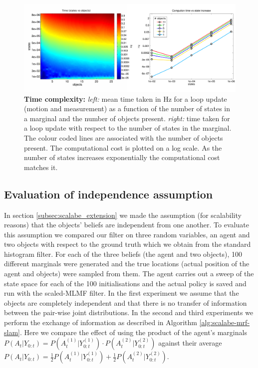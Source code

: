 \begin{figure}
 \includegraphics[width=\textwidth]{./ch5-MLMF/Figures/Figure12.pdf}
 \caption{\textbf{Time complexity:} \textit{left:} mean time taken in Hz for a loop update (motion and measurement) as a function of the number of states in a marginal and the 
 number of objects present. \textit{right:} time taken for a loop update with respect to the number of states in the marginal. The colour coded lines are 
 associated with the number of objects present. The computational cost is plotted on a log scale. As the number of states increases exponentially the
 computational cost matches it.}
 \label{fig:time_complexity}
\end{figure}


\subsection{Evaluation of independence assumption}\label{subsec:eval_indep_assumptiom}

In section \ref{subsec:scalabe_extension} we made the assumption (for scalability reasons) that the objects' beliefs are independent
from one another. To evaluate this assumption we compared our filter on three random variables, an agent and two objects with respect to the ground truth
which we obtain from the standard histogram filter. For each of the three beliefs (the agent and two objects), 100 different marginals 
were generated and the true locations (actual position of the agent and objects) were sampled from them. 
The agent carries out  a sweep of the state space for each of the 100 initialisations and the actual policy is saved 
and run with the scaled-MLMF filter. In the first experiment we assume that the objects are completely independent 
and that there is no transfer of information between the pair-wise joint distributions. In the second and third experiments we perform the exchange of information as 
described in Algorithm \ref{alg:scalabe-mrf-slam}. Here we compare the effect of using the product of the agent's marginals $P(A_t|Y_{0:t}) = P(A^{(1)}_t|Y^{(1)}_{0:t}) \cdot P(A^{(2)}_t|Y^{(2)}_{0:t})$ 
against their average $P(A_t|Y_{0:t}) = \frac{1}{2}P(A^{(1)}_t|Y^{(1)}_{0:t}) + \frac{1}{2}P(A^{(2)}_t|Y^{(2)}_{0:t})$. 

